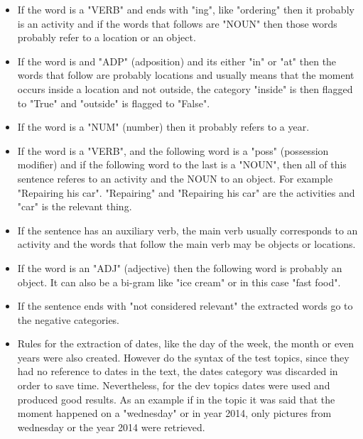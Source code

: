   \begin{itemize}
    
      \item  If the word is a "VERB" and ends with "ing", like "ordering" then it probably is an activity and if the words that follows are "NOUN" then those words probably refer to a location or an object. 
      
      
      \item  If the word is and "ADP" (adposition) and its either "in" or "at" then the words that follow are probably locations and usually means that the moment occurs inside a location and not outside, the category "inside" is then flagged to "True" and "outside" is flagged to "False".
      
      \item If the word is a "NUM" (number) then it probably refers to a year.
      
      \item If the word is a "VERB", and the following word is a "poss" (possession modifier) and if the following word to the last is a "NOUN", then all of this sentence referes to an activity and the NOUN to an object. For example "Repairing his car". "Repairing" and "Repairing his car" are the activities and "car" is the relevant thing.
      
      \item If the sentence has an auxiliary verb, the main verb usually corresponds to an activity and the words that follow the main verb may be objects or locations.
      
      \item If the word is an "ADJ" (adjective) then the following word is probably an object. It can also be a bi-gram like "ice cream" or in this case "fast food".
      
      \item If the sentence ends with "not considered relevant" the extracted words go to the negative categories.
      
      \item Rules for the extraction of dates, like the day of the week, the month or even years were also created. However do the syntax of the test topics, since they had no reference to dates in the text, the dates category was discarded in order to save time. Nevertheless, for the dev topics dates were used and produced good results. As an example if in the topic it was said that the moment happened on a "wednesday" or in year 2014, only pictures from wednesday or the year 2014 were retrieved.

    \end{itemize}
      

